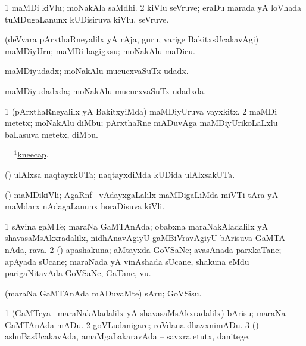 \bentry
{}
\gl{\nA}
\bmng
\bnum
\num{1} maMDi kiVlu; moNakAla saMdhi. 
\num{2} kiVlu seVruve; eraDu marada yA loVhada tuMDugaLanunx kUDisiruva kiVlu, seVruve. 
\enum
\emng
\eentry

\bentry
{}
\gl{\akirx}
\bmng
(deVvara pArxthaRneyalilx yA rAja, guru, \mo varige BakitxsUcakavAgi) maMDiyUru; maMDi bagigxsu; moNakAlu maDicu. 
\emng
\eentry

\bentry
{}
\gl{\nA}
\bmng
maMDiyudadx; moNakAlu mucucxvaSuTx udadx. 
\emng
\eentry

\bentry
{}
\gl{\gu}
\bmng
maMDiyudadxda; moNakAlu mucucxvaSuTx udadxda. 
\emng
\eentry

\bentry
{}
\gl{\nA}
\bmng
\bnum
\num{1} (pArxthaRneyalilx yA BakitxyiMda) maMDiyUruva vayxkitx. 
\num{2} maMDi metetx; moNakAlu diMbu; pArxthaRne mADuvAga maMDiyUrikoLaLxlu baLasuva metetx, diMbu. 
\enum
\emng
\eentry

\bentry
{}
\gl{\nA}
\bmng
 = \hyperlink{kneecap(1)}{$^1$kneecap}. 
\emng
\eentry

\bentry
{}
\gl{\nA}
\bmng
(\AmA) ulAlxsa naqtayxkUTa; naqtayxdiMda kUDida ulAlxsakUTa. 
\emng
\eentry

\bentry
{}
\gl{\nA}
\bmng
(\ame) maMDikiVli; AgaRnf \mo\ vAdayxgaLalilx maMDigaLiMda miVTi tAra yA maMdarx nAdagaLanunx horaDisuva kiVli. 
\emng
\eentry

\bentry
{}
\gl{\nA}
\bmng
\bnum
\num{1} sAvina gaMTe; maraNa GaMTAnAda; obabxna maraNakAladalilx yA shavasaMsAkxradalilx, nidhAnavAgiyU gaMBiVravAgiyU bArisuva GaMTA -- nAda, rava. 
\num{2} (\rUpa) apashakuna; aMtayxda GoVSaNe; avasAnada parxkaTane; apAyada sUcane; maraNada yA vinAshada sUcane, shakuna eMdu parigaNitavAda GoVSaNe, GaTane, \mo vu. 
\enum
\emng
\eentry

\bentry
{}
\gl{\sakirx}
\bmng
(maraNa GaMTAnAda mADuvaMte) sAru; GoVSisu. 
\emng

\noindent
\gl{\akirx}
\bmng
\bnum
\num{1} (GaMTeya \vi\ maraNakAladalilx yA shavasaMsAkxradalilx) bArisu; maraNa GaMTAnAda mADu. 
\num{2} goVLudanigare; roVdana dhavxnimADu. 
\num{3} (\rUpa) ashuBasUcakavAda, amaMgaLakaravAda -- savxra etutx, danitege. 
\enum
\emng

